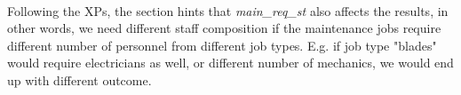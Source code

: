     \paragraph{} Following the XPs, the  section hints that 
    \textit{main\_req\_st} also affects the results, in other words, we need different staff 
    composition if the maintenance jobs require different number of personnel from different job
    types. E.g. if job type "blades" would require electricians as well, or different number of 
    mechanics, we would end up with different outcome.